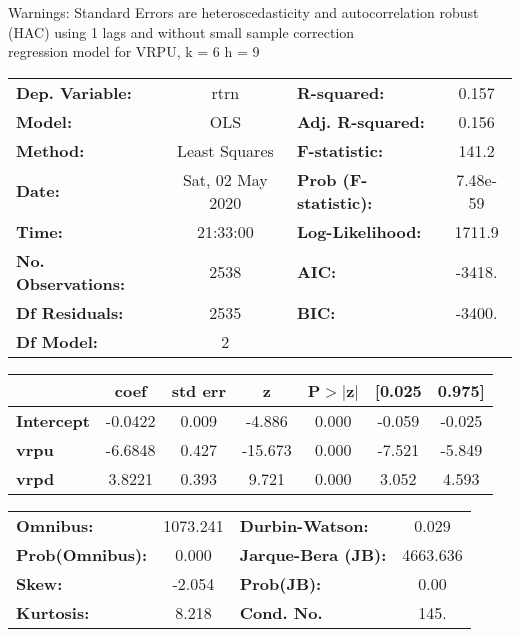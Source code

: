 Warnings: \newline
 [1] Standard Errors are heteroscedasticity and autocorrelation robust (HAC) using 1 lags and without small sample correction\\ 

regression model for VRPU, k = 6 h = 9\begin{center}
\begin{tabular}{lclc}
\toprule
\textbf{Dep. Variable:}    &       rtrn       & \textbf{  R-squared:         } &     0.157   \\
\textbf{Model:}            &       OLS        & \textbf{  Adj. R-squared:    } &     0.156   \\
\textbf{Method:}           &  Least Squares   & \textbf{  F-statistic:       } &     141.2   \\
\textbf{Date:}             & Sat, 02 May 2020 & \textbf{  Prob (F-statistic):} &  7.48e-59   \\
\textbf{Time:}             &     21:33:00     & \textbf{  Log-Likelihood:    } &    1711.9   \\
\textbf{No. Observations:} &        2538      & \textbf{  AIC:               } &    -3418.   \\
\textbf{Df Residuals:}     &        2535      & \textbf{  BIC:               } &    -3400.   \\
\textbf{Df Model:}         &           2      & \textbf{                     } &             \\
\bottomrule
\end{tabular}
\begin{tabular}{lcccccc}
                   & \textbf{coef} & \textbf{std err} & \textbf{z} & \textbf{P$> |$z$|$} & \textbf{[0.025} & \textbf{0.975]}  \\
\midrule
\textbf{Intercept} &      -0.0422  &        0.009     &    -4.886  &         0.000        &       -0.059    &       -0.025     \\
\textbf{vrpu}      &      -6.6848  &        0.427     &   -15.673  &         0.000        &       -7.521    &       -5.849     \\
\textbf{vrpd}      &       3.8221  &        0.393     &     9.721  &         0.000        &        3.052    &        4.593     \\
\bottomrule
\end{tabular}
\begin{tabular}{lclc}
\textbf{Omnibus:}       & 1073.241 & \textbf{  Durbin-Watson:     } &    0.029  \\
\textbf{Prob(Omnibus):} &   0.000  & \textbf{  Jarque-Bera (JB):  } & 4663.636  \\
\textbf{Skew:}          &  -2.054  & \textbf{  Prob(JB):          } &     0.00  \\
\textbf{Kurtosis:}      &   8.218  & \textbf{  Cond. No.          } &     145.  \\
\bottomrule
\end{tabular}
\end{center}

